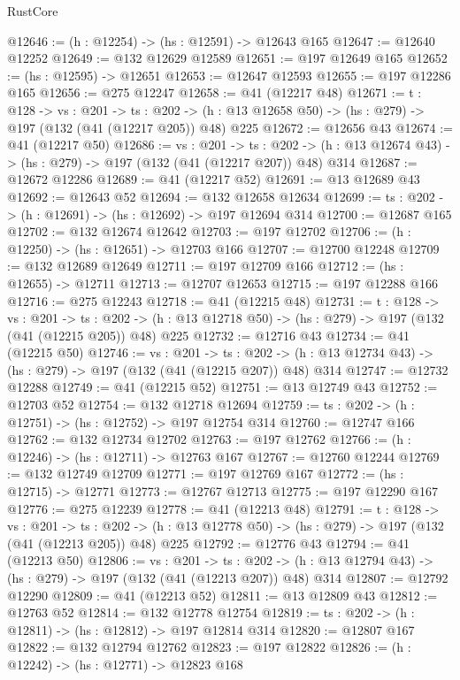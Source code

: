 \begin{lexlean}{RustCore}
\begin{coremodule}
@12646 := (h : @12254) -> (hs : @12591) -> @12643 @165
@12647 := @12640 @12252
@12649 := @132 @12629 @12589
@12651 := @197 @12649 @165
@12652 := (hs : @12595) -> @12651
@12653 := @12647 @12593
@12655 := @197 @12286 @165
@12656 := @275 @12247
@12658 := @41 (@12217 @48)
@12671 := {t : @128} ->
  {vs : @201} ->
  {ts : @202} -> (h : @13 @12658 @50) -> (hs : @279) -> @197 (@132 (@41 (@12217 @205)) @48) @225
@12672 := @12656 @43
@12674 := @41 (@12217 @50)
@12686 := {vs : @201} ->
  {ts : @202} -> (h : @13 @12674 @43) -> (hs : @279) -> @197 (@132 (@41 (@12217 @207)) @48) @314
@12687 := @12672 @12286
@12689 := @41 (@12217 @52)
@12691 := @13 @12689 @43
@12692 := @12643 @52
@12694 := @132 @12658 @12634
@12699 := {ts : @202} -> (h : @12691) -> (hs : @12692) -> @197 @12694 @314
@12700 := @12687 @165
@12702 := @132 @12674 @12642
@12703 := @197 @12702
@12706 := (h : @12250) -> (hs : @12651) -> @12703 @166
@12707 := @12700 @12248
@12709 := @132 @12689 @12649
@12711 := @197 @12709 @166
@12712 := (hs : @12655) -> @12711
@12713 := @12707 @12653
@12715 := @197 @12288 @166
@12716 := @275 @12243
@12718 := @41 (@12215 @48)
@12731 := {t : @128} ->
  {vs : @201} ->
  {ts : @202} -> (h : @13 @12718 @50) -> (hs : @279) -> @197 (@132 (@41 (@12215 @205)) @48) @225
@12732 := @12716 @43
@12734 := @41 (@12215 @50)
@12746 := {vs : @201} ->
  {ts : @202} -> (h : @13 @12734 @43) -> (hs : @279) -> @197 (@132 (@41 (@12215 @207)) @48) @314
@12747 := @12732 @12288
@12749 := @41 (@12215 @52)
@12751 := @13 @12749 @43
@12752 := @12703 @52
@12754 := @132 @12718 @12694
@12759 := {ts : @202} -> (h : @12751) -> (hs : @12752) -> @197 @12754 @314
@12760 := @12747 @166
@12762 := @132 @12734 @12702
@12763 := @197 @12762
@12766 := (h : @12246) -> (hs : @12711) -> @12763 @167
@12767 := @12760 @12244
@12769 := @132 @12749 @12709
@12771 := @197 @12769 @167
@12772 := (hs : @12715) -> @12771
@12773 := @12767 @12713
@12775 := @197 @12290 @167
@12776 := @275 @12239
@12778 := @41 (@12213 @48)
@12791 := {t : @128} ->
  {vs : @201} ->
  {ts : @202} -> (h : @13 @12778 @50) -> (hs : @279) -> @197 (@132 (@41 (@12213 @205)) @48) @225
@12792 := @12776 @43
@12794 := @41 (@12213 @50)
@12806 := {vs : @201} ->
  {ts : @202} -> (h : @13 @12794 @43) -> (hs : @279) -> @197 (@132 (@41 (@12213 @207)) @48) @314
@12807 := @12792 @12290
@12809 := @41 (@12213 @52)
@12811 := @13 @12809 @43
@12812 := @12763 @52
@12814 := @132 @12778 @12754
@12819 := {ts : @202} -> (h : @12811) -> (hs : @12812) -> @197 @12814 @314
@12820 := @12807 @167
@12822 := @132 @12794 @12762
@12823 := @197 @12822
@12826 := (h : @12242) -> (hs : @12771) -> @12823 @168

\end{coremodule}
\end{lexlean}

